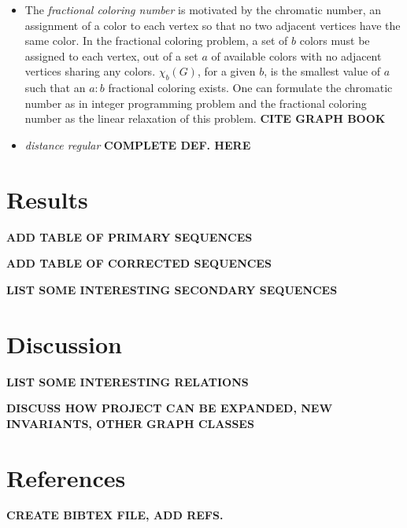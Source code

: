 \documentclass[12pt]{article}
\begin{document}
\begin{itemize}
\item The \textit{fractional coloring number} is motivated by the chromatic number, an assignment of a color to each vertex so that no two adjacent vertices have the same color. 
In the fractional coloring problem, a set of $b$ colors must be assigned to each vertex, out of a set $a$ of available colors with no adjacent vertices sharing any colors.
$\chi_b(G)$, for a given $b$, is the smallest value of $a$ such that an $a:b$ fractional coloring exists. 
One can formulate the chromatic number as in integer programming problem and the fractional coloring number as the linear relaxation of this problem. 
\textbf{CITE GRAPH BOOK}

\item \textit{distance regular}
\textbf{COMPLETE DEF. HERE}

\end{itemize}


\section{Results}

\textbf{ADD TABLE OF PRIMARY SEQUENCES}

\textbf{ADD TABLE OF CORRECTED SEQUENCES}

\textbf{LIST SOME INTERESTING SECONDARY SEQUENCES}

\section{Discussion}

\textbf{LIST SOME INTERESTING RELATIONS}

\textbf{DISCUSS HOW PROJECT CAN BE EXPANDED, NEW INVARIANTS, OTHER GRAPH CLASSES}

\section{References}

\textbf{CREATE BIBTEX FILE, ADD REFS.}
\end{document}
